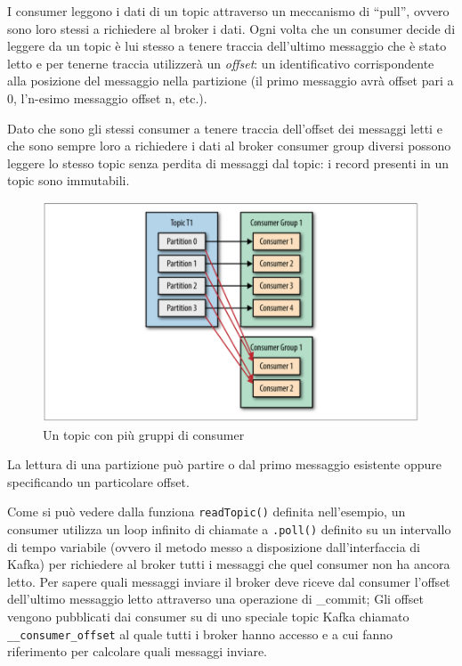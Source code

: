 \documentclass[]{article}
\begin{document}
I consumer leggono i dati di un topic attraverso un meccanismo di
``pull'', ovvero sono loro stessi a richiedere al broker i dati. Ogni
volta che un consumer decide di leggere da un topic è lui stesso a
tenere traccia dell'ultimo messaggio che è stato letto e per tenerne
traccia utilizzerà un \emph{offset}: un identificativo corrispondente
alla posizione del messaggio nella partizione (il primo messaggio avrà
offset pari a 0, l'n-esimo messaggio offset n, etc.).

Dato che sono gli stessi consumer a tenere traccia dell'offset dei
messaggi letti e che sono sempre loro a richiedere i dati al broker
consumer group diversi possono leggere lo stesso topic senza perdita di
messaggi dal topic: i record presenti in un topic sono immutabili.

\begin{figure}
\centering
\includegraphics[width=1.00000\textwidth]{../images/consumer-groups.png}
\caption{Un topic con più gruppi di consumer \label{figure_3}}
\end{figure}

La lettura di una partizione può partire o dal primo messaggio esistente
oppure specificando un particolare offset.

Come si può vedere dalla funziona \texttt{readTopic()} definita
nell'esempio, un consumer utilizza un loop infinito di chiamate a
\texttt{.poll()} definito su un intervallo di tempo variabile (ovvero il
metodo messo a disposizione dall'interfaccia di Kafka) per richiedere al
broker tutti i messaggi che quel consumer non ha ancora letto. Per
sapere quali messaggi inviare il broker deve riceve dal consumer
l'offset dell'ultimo messaggio letto attraverso una operazione di
\_commit; Gli offset vengono pubblicati dai consumer su di uno speciale
topic Kafka chiamato \texttt{\_\_consumer\_offset} al quale tutti i
broker hanno accesso e a cui fanno riferimento per calcolare quali
messaggi inviare.
\end{document}
